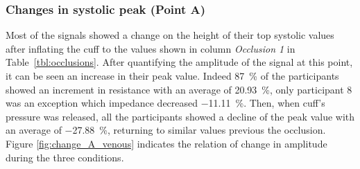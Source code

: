 \subsubsection{Changes in systolic peak (Point A)}
\label{section5.3.1.1}
Most of the signals showed a change on the height of their top systolic values after inflating the cuff to the values shown in column \textit{Occlusion 1} in Table~\ref{tbl:occlusions}. After quantifying the amplitude of the signal at this point, it can be seen an increase in their peak value. Indeed \SI{87}{\percent} of the participants showed an increment in resistance with an average of \SI{20.93}{\percent}, only participant 8 was an exception which impedance decreased \SI{-11.11}{\percent}. Then, when cuff's pressure was released, all the participants showed a decline of the peak value with an average of \SI{-27.88}{\percent}, returning to similar values previous the occlusion. Figure \ref{fig:change_A_venous} indicates the relation of change in amplitude during the three conditions. 

